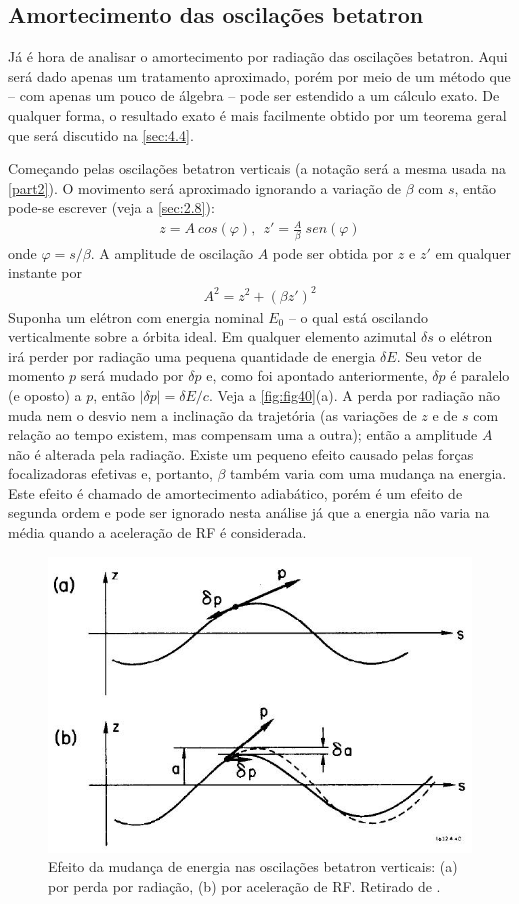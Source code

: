 \subsection{Amortecimento das oscilações betatron}
Já é hora de analisar o amortecimento por radiação das oscilações betatron. Aqui será dado apenas um tratamento aproximado, porém por meio de um método que -- com apenas um pouco de álgebra -- pode ser estendido a um cálculo exato. De qualquer forma, o resultado exato é mais facilmente obtido por um teorema geral que será discutido na \autoref{sec:4.4}.

Começando pelas oscilações betatron verticais (a notação será a mesma usada na \autoref{part2}). O movimento será aproximado ignorando a variação de $\beta$ com $s$, então pode-se escrever (veja a \autoref{sec:2.8}):
\begin{align}
	z = A\ cos(\varphi), \ \ z' = \frac{A}{\beta}\ sen(\varphi)\label{eq:4.24}
\end{align}
onde $\varphi = s/\beta$. A amplitude de oscilação $A$ pode ser obtida por $z$ e $z'$ em qualquer instante por
\begin{align}
	A^2 = z^2 + (\beta z')^2
\end{align}
Suponha um elétron com energia nominal $E_0$ -- o qual está oscilando verticalmente sobre a órbita ideal. Em qualquer elemento azimutal $\delta s$ o elétron irá perder por radiação uma pequena quantidade de energia $\delta E$. Seu vetor de momento $p$ será mudado por $\delta p$ e, como foi apontado anteriormente, $\delta p$ é paralelo (e oposto) a $p$, então $|\delta p| = \delta E/c$. Veja a \autoref{fig:fig40}(a). A perda por radiação não muda nem o desvio nem a inclinação da trajetória (as variações de $z$ e de $s$ com relação ao tempo existem, mas compensam uma a outra); então a amplitude $A$ não é alterada pela radiação. Existe um pequeno efeito causado pelas forças focalizadoras efetivas e, portanto, $\beta$ também varia com uma mudança na energia. Este efeito é chamado de amortecimento adiabático, porém é um efeito de segunda ordem e pode ser ignorado nesta análise já que a energia não varia na média quando a aceleração de RF é considerada.

\begin{figure}[!htb]
	\centering
	\includegraphics[width=0.7\linewidth]{./Figuras/fig40.jpeg}
	\caption{Efeito da mudança de energia nas oscilações betatron verticais: (a) por perda por radiação, (b) por aceleração de RF. Retirado de \cite{sands1970physics}.}
	\label{fig:fig40}
\end{figure}

